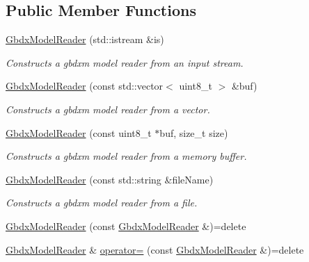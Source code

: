 \subsection*{Public Member Functions}
\begin{DoxyCompactItemize}
\item 
\hyperlink{group___classification_module_gaf76d6b5a7aedc2124731adf9e3858853}{Gbdx\+Model\+Reader} (std\+::istream \&is)
\begin{DoxyCompactList}\small\item\em Constructs a gbdxm model reader from an input stream. \end{DoxyCompactList}\item 
\hyperlink{group___classification_module_ga3253da2225ab14f864894af9ddea77db}{Gbdx\+Model\+Reader} (const std\+::vector$<$ uint8\+\_\+t $>$ \&buf)
\begin{DoxyCompactList}\small\item\em Constructs a gbdxm model reader from a vector. \end{DoxyCompactList}\item 
\hyperlink{group___classification_module_ga5f5b18f2c2c2349d68cf670d8f7ea3ec}{Gbdx\+Model\+Reader} (const uint8\+\_\+t $\ast$buf, size\+\_\+t size)
\begin{DoxyCompactList}\small\item\em Constructs a gbdxm model reader from a memory buffer. \end{DoxyCompactList}\item 
\hyperlink{group___classification_module_ga1a936c6873d8a865411691d42d37ca28}{Gbdx\+Model\+Reader} (const std\+::string \&file\+Name)
\begin{DoxyCompactList}\small\item\em Constructs a gbdxm model reader from a file. \end{DoxyCompactList}\item 
\hyperlink{classdg_1_1deepcore_1_1classification_1_1_gbdx_model_reader_a3f90482a7b8d7af6e5722af4a862000d}{Gbdx\+Model\+Reader} (const \hyperlink{classdg_1_1deepcore_1_1classification_1_1_gbdx_model_reader}{Gbdx\+Model\+Reader} \&)=delete
\item 
\hyperlink{classdg_1_1deepcore_1_1classification_1_1_gbdx_model_reader}{Gbdx\+Model\+Reader} \& \hyperlink{classdg_1_1deepcore_1_1classification_1_1_gbdx_model_reader_a448613f6bbdf70e453d25ac2a1fca6a5}{operator=} (const \hyperlink{classdg_1_1deepcore_1_1classification_1_1_gbdx_model_reader}{Gbdx\+Model\+Reader} \&)=delete
\item 

\end{DoxyCompactItemize}

